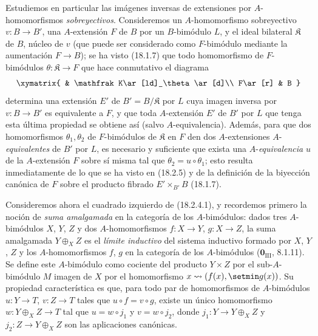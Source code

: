 \begin{env}[18.2.6]
\label{0.18.2.6-es}
Estudiemos en particular las imágenes inversas de extensiones por
$A$-homomorfismos \emph{sobreyectivos}. Consideremos un $A$-homomorfismo
sobreyectivo $v:B\to B'$, una $A$-extensión $F$ de $B$ por un $B$-bimódulo $L$,
y el ideal bilateral $\mathfrak K$ de $B$, núcleo de $v$ (que puede ser
considerado como $F$-bimódulo mediante la aumentación $F\to B$); se ha visto
(18.1.7) que todo homomorfismo de $F$-bimódulos
$\theta:\mathfrak K\to F$ que hace conmutativo el diagrama
\[
  \xymatrix{
    & \mathfrak K\ar[ld]_\theta\ar[d]\\
    F\ar[r] & B
  }
\]
determina una extensión $E'$ de $B'=B/\mathfrak K$ por $L$ cuya imagen
inversa por $v:B\to B'$ es equivalente a $F$, y que toda $A$-extensión
$E'$ de $B'$ por $L$ que tenga esta última propiedad se obtiene así (salvo
$A$-equivalencia). Además, para que dos homomorfismos
$\theta_1,\theta_2$ de $F$-bimódulos de $\mathfrak K$ en $F$ den dos
  $A$-extensiones $A$-\emph{equivalentes} de $B'$ por $L$, es necesario y suficiente que
exista una $A$-\emph{equivalencia} $u$ de la $A$-extensión $F$ sobre sí misma tal que
$\theta_2=u\circ\theta_1$; esto resulta inmediatamente de lo que se ha visto en
(18.2.5) y de la definición de la biyección canónica de $F$ sobre el producto
fibrado $E'\times_{B'}B$ (18.1.7).
\end{env}

\begin{env}[18.2.7]
\label{0.18.2.7-es}
Consideremos ahora el cuadrado izquierdo de (18.2.4.1), y recordemos primero
la noción de \emph{suma amalgamada} en la categoría de los $A$-bimódulos:
dados tres $A$-bimódulos $X$, $Y$, $Z$ y dos $A$-homomorfismos
$f:X\to Y$, $g:X\to Z$, la suma amalgamada $Y\oplus_XZ$ es el \emph{límite
inductivo} del sistema inductivo formado por $X$, $Y$, $Z$ y los
$A$-homomorfismos $f$, $g$ en la categoría de los $A$-bimódulos
($\mathbf{0}_{\mathrm{III}}$, 8.1.11). Se define este $A$-bimódulo como cociente del
producto $Y\times Z$ por el sub-$A$-bimódulo $M$ imagen de $X$ por
el homomorfismo $x\leadsto(f(x),\setmin g(x))$. Su propiedad característica es que,
para todo par de homomorfismos de $A$-bimódulos $u:Y\to T$, $v:Z\to T$
tales que $u\circ f=v\circ g$, existe un único homomorfismo
$w:Y\oplus_XZ\to T$ tal que $u=w\circ j_1$ y $v=w\circ j_2$, donde
$j_1:Y\to Y\oplus_XZ$ y $j_2:Z\to Y\oplus_XZ$ son las aplicaciones
canónicas.
\end{env}

